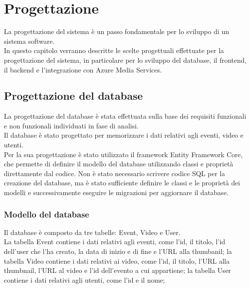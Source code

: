 \chapter{Progettazione}
\label{cap:progettazione}

La progettazione del sistema è un passo fondamentale per lo sviluppo di un sistema software.\\
In questo capitolo verranno descritte le scelte progettuali effettuate per la progettazione del sistema, in particolare per lo sviluppo del database, il frontend, il backend e l'integrazione con Azure Media Services.\\



\section{Progettazione del database}
La progettazione del database è stata effettuata sulla base dei requisiti funzionali e non funzionali individuati in fase di analisi.\\
Il database è stato progettato per memorizzare i dati relativi agli eventi, video e utenti.\\
Per la sua progettazione è stato utilizzato il framework Entity Framework Core, che permette di definire il modello del database utilizzando classi e proprietà direttamente dal codice. Non è stato necessario scrivere codice SQL per la creazione del database, ma è stato sufficiente definire le classi e le proprietà dei modelli e successivamente eseguire le migrazioni per aggiornare il database.\\

\clearpage

\subsection{Modello del database}
Il database è composto da tre tabelle: Event, Video e User.\\
La tabella Event contiene i dati relativi agli eventi, come l'id, il titolo, l'id dell'user che l'ha creato, la data di inizio e di fine e l'URL alla thumbanil; la tabella Video contiene i dati relativi ai video, come l'id, il titolo, l'URL alla thumbnail, l'URL al video e l'id dell'evento a cui appartiene; la tabella User contiene i dati relativi agli utenti, come l'id e il nome;

